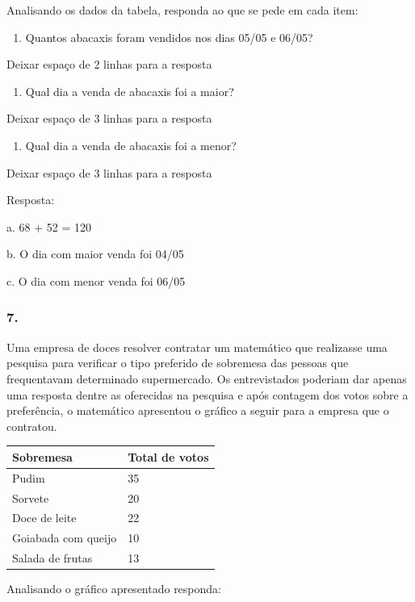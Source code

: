 Analisando os dados da tabela, responda ao que se pede em cada item:

\begin{enumerate}
\def\labelenumi{\alph{enumi})}
\item
  Quantos abacaxis foram vendidos nos dias 05/05 e 06/05?
\end{enumerate}

Deixar espaço de 2 linhas para a resposta

\begin{enumerate}
\def\labelenumi{\alph{enumi})}
\item
  Qual dia a venda de abacaxis foi a maior?
\end{enumerate}

Deixar espaço de 3 linhas para a resposta

\begin{enumerate}
\def\labelenumi{\alph{enumi})}
\item
  Qual dia a venda de abacaxis foi a menor?
\end{enumerate}

Deixar espaço de 3 linhas para a resposta

Resposta:

a. 68 + 52 = 120

b. O dia com maior venda foi 04/05

c. O dia com menor venda foi 06/05

\subsubsection{7.}\label{section-114}

Uma empresa de doces resolver contratar um matemático que realizasse uma
pesquisa para verificar o tipo preferido de sobremesa das pessoas que
frequentavam determinado supermercado. Os entrevistados poderiam dar
apenas uma resposta dentre as oferecidas na pesquisa e após contagem dos
votos sobre a preferência, o matemático apresentou o gráfico a seguir
para a empresa que o contratou.

\begin{longtable}[]{@{}ll@{}}
\toprule
Sobremesa & Total de votos\tabularnewline
\midrule
\endhead
Pudim & 35\tabularnewline
Sorvete & 20\tabularnewline
Doce de leite & 22\tabularnewline
Goiabada com queijo & 10\tabularnewline
Salada de frutas & 13\tabularnewline
\bottomrule
\end{longtable}

Analisando o gráfico apresentado responda:

